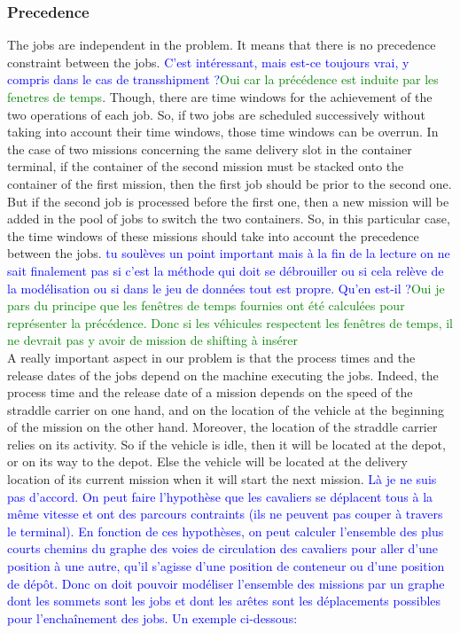 \documentclass[a4paper,10pt]{article}
\begin{document}
\subsubsection{Precedence}
The jobs are independent in the problem. It means that there is no precedence constraint between the jobs. \textcolor{blue}{C'est intéressant, mais est-ce toujours vrai, y compris dans le cas de transshipment ?}\textcolor{green}{Oui car la précédence est induite par les fenetres de temps}. Though, there are time windows for the achievement of the two operations of each job. So, if two jobs are scheduled successively without taking into account their time windows, those time windows can be overrun. In the case of two missions concerning the same delivery slot in the container terminal, if the container of the second mission must be stacked onto the container of the first mission, then the first job should be prior to the second one. But if the second job is processed before the first one, then a new mission will be added in the pool of jobs to switch the two containers. So, in this particular case, the time windows of these missions should take into account the precedence between the jobs. \textcolor{blue}{tu soulèves un point important mais à la fin de la lecture on ne sait finalement pas si c'est la méthode qui doit se débrouiller ou si cela relève de la modélisation ou si dans le jeu de données tout est propre. Qu'en est-il ?}\textcolor{green}{Oui je pars du principe que les fenêtres de temps fournies ont été calculées pour représenter la précédence. Donc si les véhicules respectent les fenêtres de temps, il ne devrait pas y avoir de mission de shifting à insérer}\\

A really important aspect in our problem is that the process times and the release dates of the jobs depend on the machine executing the jobs. Indeed, the process time and the release date of a mission depends on the speed of the straddle carrier on one hand, and on the location of the vehicle at the beginning of the mission on the other hand. Moreover, the location of the straddle carrier relies on its activity. So if the vehicle is idle, then it will be located at the depot, or on its way to the depot. Else the vehicle will be located at the delivery location of its current mission when it will start the next mission. \textcolor{blue}{Là je ne suis pas d'accord. On peut faire l'hypothèse que les cavaliers se déplacent tous à la même vitesse et ont des parcours contraints (ils ne peuvent pas couper à travers le terminal). En fonction de ces hypothèses, on peut calculer l'ensemble des plus courts chemins du graphe des voies de circulation des cavaliers pour aller d'une position à une autre, qu'il s'agisse d'une position de conteneur ou d'une position de dépôt. Donc on doit pouvoir modéliser l'ensemble des missions par un graphe dont les sommets sont les jobs et dont les arêtes sont les déplacements possibles pour l'enchaînement des jobs. Un exemple ci-dessous:}\\
\end{document}
